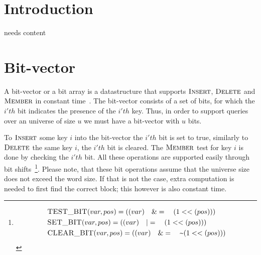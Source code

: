 \documentclass[oneside,11pt,openright]{report}
\newcommand{\Insert}{\textsc{Insert}}
\newcommand{\Delete}{\textsc{Delete}}
\newcommand{\Member}{\textsc{Member}}
\begin{document}

\pagestyle{empty} 
\vspace*{\fill}
\clearpage


\tableofcontents
{}
\setcounter{secnumdepth}{2}


\chapter{Introduction}

needs content

\chapter{Bit-vector}

A bit-vector or a bit array is a datastructure that supports
$\Insert$, $\Delete$ and $\Member$ in constant
time~\cite[p. 532]{ITA09}. The bit-vector consists of a set of bits,
for which the $i'th$ bit indicates the presence of the
$i'th$ key. Thus, in order to support queries over an universe of size $u$ we must
have a bit-vector with $u$ bits.

To $\Insert$ some key $i$ into the bit-vector the $i'th$ bit is set to
true, similarly to $\Delete$ the same key $i$, the $i'th$ bit is
cleared. The $\Member$ test for key $i$ is done by checking the $i'th$
bit. All these operations are supported easily through bit
shifts~\footnote{\begin{align*} & \textsc{TEST\_BIT}(var,pos) =
    ((var)\quad \&=\quad(1<<(pos))) \\ & \textsc{SET\_BIT}(var,pos) =
    ((var)\quad|=\quad(1<<(pos))) \\ & \textsc{CLEAR\_BIT}(var,pos) =
    ((var)\quad\&=\quad\textsf{\textasciitilde}(1<<(pos)))
\end{align*}}. 
Please note, that these bit operations assume that the universe size
does not exceed the word size. If that is not the case, extra
computation is needed to first find the correct block; this however is
also constant time.
\end{document}
